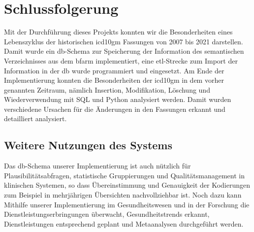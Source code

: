 \chapter{Schlussfolgerung} \label{ch:conclusion}

Mit der Durchführung dieses Projekts konnten wir die Besonderheiten eines Lebenszyklus der historischen \ac{icd10gm} Fassungen von 2007 bis 2021 darstellen. Damit wurde ein \ac{db}-Schema zur Speicherung der Information des semantischen Verzeichnisses aus dem \ac{bfarm} implementiert, eine \ac{etl}-Strecke zum Import der Information in der \ac{db} wurde programmiert und eingesetzt. Am Ende der Implementierung konnten die Besonderheiten der \ac{icd10gm} in dem vorher genannten Zeitraum, nämlich Insertion, Modifikation, Löschung und Wiederverwendung mit SQL und Python analysiert werden. Damit wurden verschiedene Ursachen für die Änderungen in den Fassungen erkannt und detailliert analysiert.

\section{Weitere Nutzungen des Systems} \label{sec:future}

Das \ac{db}-Schema unserer Implementierung ist auch nützlich für Plausibilitätsabfragen, statistische Gruppierungen und Qualitätsmanagement in klinischen Systemen, so dass Übereinstimmung und Genauigkeit der Kodierungen zum Beispiel in mehrjährigen Übersichten nachvollziehbar ist. Noch dazu kann Mithilfe unserer Implementierung im Gesundheitswesen und in der Forschung die Dienstleistungserbringungen überwacht, Gesundheitstrends erkannt, Dienstleistungen entsprechend geplant und Metaanalysen durchgeführt werden.